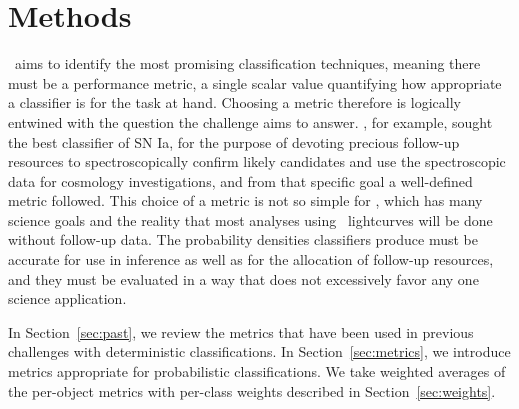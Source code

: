 \section{Methods}
\label{sec:methods}


\plasticc\ aims to identify the most promising classification techniques, meaning there must be a performance metric, a single scalar value quantifying how appropriate a classifier is for the task at hand.
Choosing a metric therefore is logically entwined with the question the challenge aims to answer.
\snphotcc, for example, sought the best classifier of SN Ia, for the purpose of devoting precious follow-up resources to spectroscopically confirm likely candidates and use the spectroscopic data for cosmology investigations, and from that specific goal a well-defined metric followed.
This choice of a metric is not so simple for \plasticc, which has many science goals and the reality that most analyses using \lsst\ lightcurves will be done without follow-up data.
The probability densities classifiers produce must be accurate for use in inference as well as for the allocation of follow-up resources, and they must be evaluated in a way that does not excessively favor any one science application.

In Section~\ref{sec:past}, we review the metrics that have been used in previous challenges with deterministic classifications.
In Section~\ref{sec:metrics}, we introduce metrics appropriate for probabilistic classifications.
We take weighted averages of the per-object metrics with per-class weights described in Section~\ref{sec:weights}.

